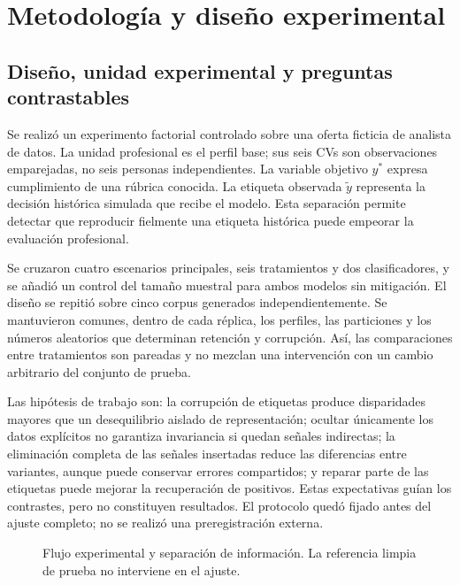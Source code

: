 \documentclass[11pt,a4paper,oneside]{report}
\begin{document}
\chapter{Metodología y diseño experimental}
\label{cap:metodologia}
\section{Diseño, unidad experimental y preguntas contrastables}
Se realizó un experimento factorial controlado sobre una oferta ficticia de analista de datos. La unidad profesional es el perfil base; sus seis CVs son observaciones emparejadas, no seis personas independientes. La variable objetivo $y^*$ expresa cumplimiento de una rúbrica conocida. La etiqueta observada $\tilde y$ representa la decisión histórica simulada que recibe el modelo. Esta separación permite detectar que reproducir fielmente una etiqueta histórica puede empeorar la evaluación profesional.

Se cruzaron cuatro escenarios principales, seis tratamientos y dos clasificadores, y se añadió un control del tamaño muestral para ambos modelos sin mitigación. El diseño se repitió sobre cinco corpus generados independientemente. Se mantuvieron comunes, dentro de cada réplica, los perfiles, las particiones y los números aleatorios que determinan retención y corrupción. Así, las comparaciones entre tratamientos son pareadas y no mezclan una intervención con un cambio arbitrario del conjunto de prueba.

Las hipótesis de trabajo son: la corrupción de etiquetas produce disparidades mayores que un desequilibrio aislado de representación; ocultar únicamente los datos explícitos no garantiza invariancia si quedan señales indirectas; la eliminación completa de las señales insertadas reduce las diferencias entre variantes, aunque puede conservar errores compartidos; y reparar parte de las etiquetas puede mejorar la recuperación de positivos. Estas expectativas guían los contrastes, pero no constituyen resultados. El protocolo quedó fijado antes del ajuste completo; no se realizó una preregistración externa.


\begin{figure}[htbp]\centering
{}
\caption[Flujo experimental y separación de información]{Flujo experimental y separación de información. La referencia limpia de prueba no interviene en el ajuste.}\label{fig:proceso}\end{figure}
\end{document}
